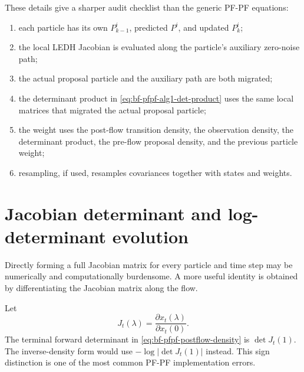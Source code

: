 These details give a sharper audit checklist than the generic PF-PF equations:
\begin{enumerate}[label=(\roman*)]
  \item each particle has its own $P_{k-1}^i$, predicted $P^i$, and updated
    $P_k^i$;
  \item the local LEDH Jacobian is evaluated along the particle's auxiliary
    zero-noise path;
  \item the actual proposal particle and the auxiliary path are both migrated;
  \item the determinant product in
    \eqref{eq:bf-pfpf-alg1-det-product} uses the same local matrices that
    migrated the actual proposal particle;
  \item the weight uses the post-flow transition density, the observation
    density, the determinant product, the pre-flow proposal density, and the
    previous particle weight;
  \item resampling, if used, resamples covariances together with states and
    weights.
\end{enumerate}



\section{Jacobian determinant and log-determinant evolution}
\label{sec:bf-pfpf-logdet}

Directly forming a full Jacobian matrix for every particle and time step may be
numerically and computationally burdensome.  A more useful identity is obtained
by differentiating the Jacobian matrix along the flow.

Let
\begin{equation}
\label{eq:bf-pfpf-jacobian-matrix}
  J_t(\lambda)
  = \frac{\partial x_t(\lambda)}{\partial x_t(0)}.
\end{equation}
The terminal forward determinant in
\eqref{eq:bf-pfpf-postflow-density} is $\det J_t(1)$.  The inverse-density form
would use $-\log|\det J_t(1)|$ instead.  This sign distinction is one of the
most common PF-PF implementation errors.

